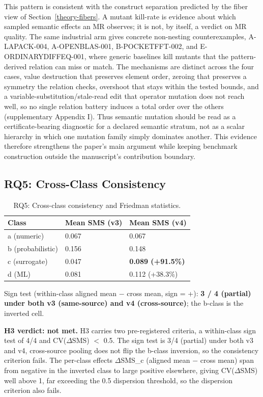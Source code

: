\documentclass[manuscript,screen,review]{acmart}
\begin{document}
This pattern is consistent with the construct separation predicted by the
fiber view of Section~\ref{theory-fibers}. A mutant kill-rate is evidence about which sampled
semantic effects an MR observes; it is not, by itself, a verdict on MR
quality. The same industrial arm gives concrete non-nesting
counterexamples, A-LAPACK-004, A-OPENBLAS-001, B-POCKETFFT-002, and
E-ORDINARYDIFFEQ-001, where generic baselines kill mutants that the
pattern-derived relation can miss or match. The mechanisms are
distinct across the four cases, value destruction that preserves
element order, zeroing that preserves a symmetry the relation checks,
overshoot that stays within the tested bounds, and a
variable-substitution/stale-read edit that operator mutation does not
reach well, so no single relation battery induces a total order over
the others (supplementary Appendix I).
Thus semantic mutation should be read as a certificate-bearing diagnostic
for a declared semantic stratum, not as a scalar hierarchy in which one
mutation family simply dominates another. This evidence therefore
strengthens the paper's main argument while keeping benchmark construction
outside the manuscript's contribution boundary.

\subsection{RQ5: Cross-Class Consistency}\label{rq3-cross-class-consistency-and-friedman}

{%
\begin{longtable}[]{@{}lll@{}}
\caption{RQ5: Cross-class consistency and Friedman statistics.}\label{tab:p2-12}\\
\toprule\noalign{}
Class & Mean SMS (v3) & Mean SMS (v4) \\
\midrule\noalign{}
\endfirsthead
\endhead
\bottomrule\noalign{}
\endlastfoot
a (numeric) & 0.067 & 0.067 \\
b (probabilistic) & 0.156 & 0.148 \\
c (surrogate) & 0.047 & \textbf{0.089 (+91.5\%)} \\
d (ML) & 0.081 & 0.112 (+38.3\%) \\
\end{longtable}
}

Sign test (within-class aligned mean $-$ cross mean, sign = +): \textbf{3
/ 4 (partial) under both v3 (same-source) and v4 (cross-source)}; the
b-class is the inverted cell.

\textbf{H3 verdict: not met.} H3 carries two pre-registered criteria, a
within-class sign test of 4/4 and CV($\Delta$SMS) $<$ 0.5. The sign test
is 3/4 (partial) under both v3 and v4, cross-source pooling does not
flip the b-class inversion, so the consistency criterion fails. The
per-class effects $\Delta$SMS\_c (aligned mean $-$ cross mean) span from
negative in the inverted class to large positive elsewhere, giving
CV($\Delta$SMS) well above 1, far exceeding the 0.5 dispersion threshold,
so the dispersion criterion also fails.
\end{document}
